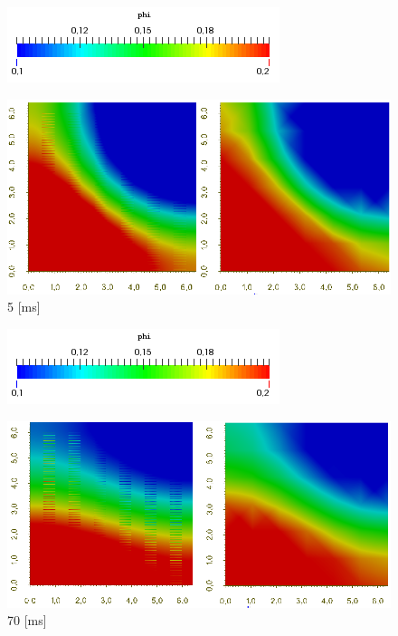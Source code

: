 \documentclass[11pt,spanish]{beamer}
\begin{document}
\begin{frame}
\begin{figure}[H]
\centering
\includegraphics[height = 0.9 cm]{fig/theorem_verification_r2_exp2_colorbar}
\end{figure}
\begin{figure}[H]
\centering
\includegraphics[height = 5 cm]{fig/theorem_verification_r2_exp2_5ms}
\caption{5 [ms]}
\end{figure}
\end{frame}

\begin{frame}
\begin{figure}[H]
\centering
\includegraphics[height = 0.9 cm]{fig/theorem_verification_r2_exp2_colorbar}
\end{figure}
\begin{figure}[H]
\centering
\includegraphics[height = 5 cm]{fig/theorem_verification_r2_exp2_70ms}
\caption{70 [ms]}
\end{figure}
\end{frame}
\end{document}
